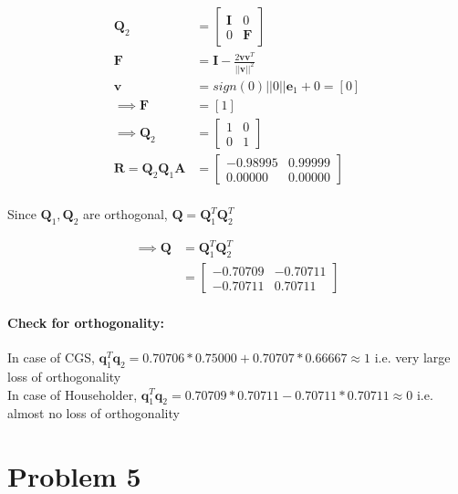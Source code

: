 \documentclass[12pt, letterpaper]{article}
\begin{document}
\begin{align*}
  \mathbf{Q}_2 &= \begin{bmatrix} \mathbf{I} & 0 \\ 0 & \mathbf{F} \end{bmatrix}\\
  \mathbf{F} &= \mathbf{I} - \frac{2\mathbf{v}\mathbf{v}^T}{||\mathbf{v}||^2}\\
  \mathbf{v} &= sign(0)||0||\mathbf{e}_1 + 0 = [0]\\
  \implies \mathbf{F} &= [1]\\
  \implies \mathbf{Q}_2 &= \begin{bmatrix}1 & 0 \\ 0 & 1 \end{bmatrix}\\
  \mathbf{R} = \mathbf{Q}_2\mathbf{Q}_1\mathbf{A} &= \begin{bmatrix} 
      -0.98995  & 0.99999 \\ 0.00000  & 0.00000
    \end{bmatrix}\\
\end{align*}

Since $\mathbf{Q}_1, \mathbf{Q}_2$ are orthogonal, $\mathbf{Q} = \mathbf{Q}_1^T\mathbf{Q}_2^T$

\begin{align*}
  \implies \mathbf{Q} &= \mathbf{Q}_1^T\mathbf{Q}_2^T\\
  &= \begin{bmatrix}-0.70709 & -0.70711 \\ -0.70711 & 0.70711\end{bmatrix}
\end{align*}

\paragraph{Check for orthogonality:}

In case of CGS, $\mathbf{q}_1^T\mathbf{q}_2 = 0.70706 * 0.75000 + 0.70707 * 0.66667 \approx 1$ i.e. very large loss of orthogonality\\

In case of Householder, $\mathbf{q}_1^T\mathbf{q}_2 = 0.70709 * 0.70711 - 0.70711 * 0.70711 \approx 0$ i.e. almost no loss of orthogonality\\



\pagebreak
\section*{Problem 5}
\label{sec:prob5}
\end{document}
